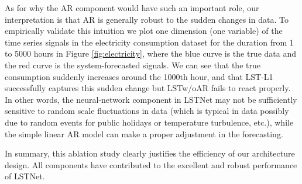 As for why the AR component would have such an important role, our interpretation is that AR is generally robust to the sudden changes in data. To empirically validate this intuition we plot one dimension (one variable) of the time series signals in the electricity consumption dataset for the duration from 1 to 5000 hours in Figure \ref{fig:electricity}, where the blue curve is the true data and the red curve is the system-forecasted signals. We can see that the true consumption suddenly increases around the 1000th hour, and that LST-L1 successfully captures this sudden change but LSTw/oAR fails to react properly.  In other words, the neural-network component in LSTNet may not be sufficiently sensitive to random scale fluctuations in data (which is typical in \electricity data possibly due to random events for public holidays or temperature turbulence, etc.), while the simple linear AR model can make a proper adjustment in the forecasting.


In summary, this ablation study clearly justifies the efficiency of our architecture design. All components have contributed to the excellent and robust performance of LSTNet.




